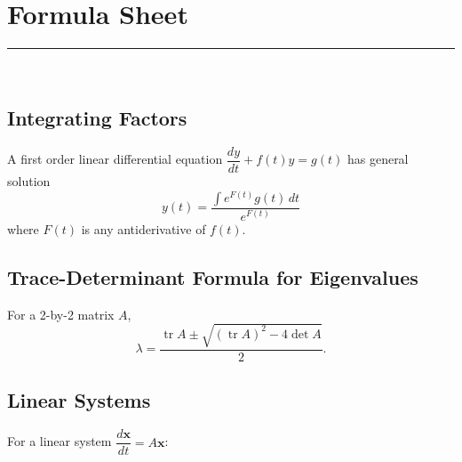\documentclass[10pt]{article}
\newcommand{\tr}{\operatorname{tr}}
\begin{document}
\section*{Formula Sheet} %
\hrule

~

\subsection*{Integrating Factors}

A first order linear differential equation $\dfrac{dy}{dt} + f(t) y = g(t)$ has general solution 
$$y(t) = \frac{\int e^{F(t)} g(t) \, dt}{e^{F(t)}}$$
where $F(t)$ is any antiderivative of $f(t)$.

\subsection*{Trace-Determinant Formula for Eigenvalues}

For a 2-by-2 matrix $A$, 
$$\lambda = \frac{\tr A \pm \sqrt{(\tr A)^2 - 4 \det A}}{2}.$$

\subsection*{Linear Systems} 

For a linear system $\dfrac{d\mathbf{x}}{dt} = A \mathbf{x}$:
\end{document}
